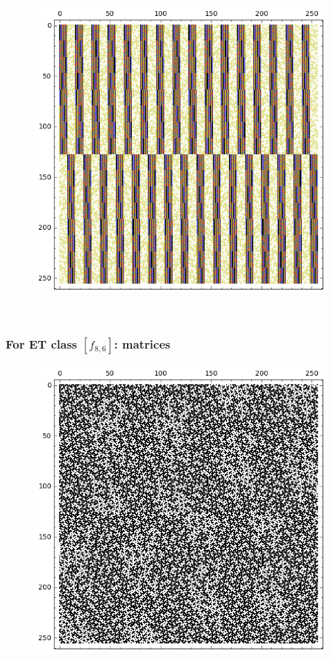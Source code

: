 \documentclass[pdf,sprung,slideColor,nocolorBG]{beamer}
\newenvironment{colortheme}[1]{
\def\ProvidesPackageRCS $##1${\relax}
\renewcommand{\ProcessOptions}{\relax}
\makeatletter

\makeatother
}{}
\begin{document}
\begin{colortheme}{jubata}
\begin{frame}
\begin{figure}
\begin{minipage}{.48\textwidth}
  \label{fig:8_5_weight_class_matrix}
\end{minipage}%
\begin{minipage}{.48\textwidth}
  \centering
  \includegraphics[width=.9\linewidth]{../matrix_plot/re8_5_bent_cayley_graph_index_matrix.png}
  \label{fig:8_5_bent_cayley_graph_index_matrix}
\end{minipage}
\end{figure}
~
\end{frame}
\begin{frame}
\frametitle{For ET class $[f_{8,6}]$: matrices}
\begin{figure}
\centering
\begin{minipage}{.48\textwidth}
  \centering
  \includegraphics[width=.9\linewidth]{../matrix_plot/re8_6_weight_class_matrix.png}

\end{minipage}
\end{figure}
\end{frame}
\end{colortheme}
\end{document}
